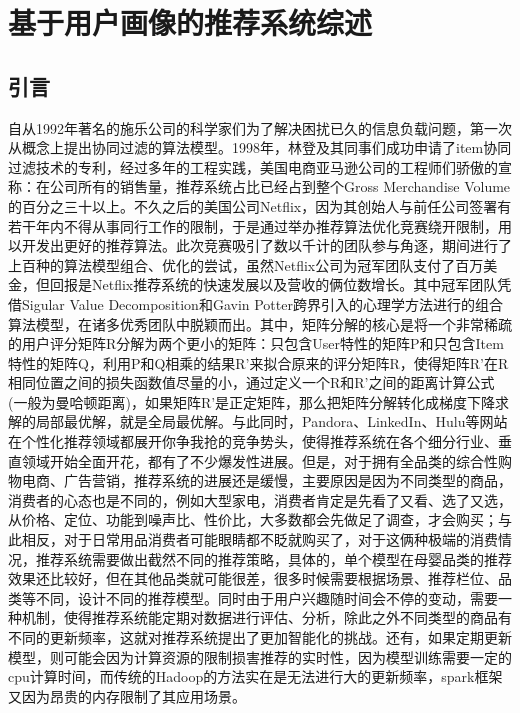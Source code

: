 \chapter{基于用户画像的推荐系统综述}
	\section{引言}
	自从1992年著名的施乐公司的科学家们为了解决困扰已久的信息负载问题，第一次从概念上提出协同过滤的算法模型。1998年，林登及其同事们成功申请了item协同过滤技术的专利，经过多年的工程实践，美国电商亚马逊公司的工程师们骄傲的宣称：在公司所有的销售量，推荐系统占比已经占到整个Gross Merchandise Volume的百分之三十以上。不久之后的美国公司Netflix，因为其创始人与前任公司签署有若干年内不得从事同行工作的限制，于是通过举办推荐算法优化竞赛绕开限制，用以开发出更好的推荐算法。此次竞赛吸引了数以千计的团队参与角逐，期间进行了上百种的算法模型组合、优化的尝试，虽然Netflix公司为冠军团队支付了百万美金，但回报是Netflix推荐系统的快速发展以及营收的俩位数增长。其中冠军团队凭借Sigular Value Decomposition和Gavin Potter跨界引入的心理学方法进行的组合算法模型，在诸多优秀团队中脱颖而出。其中，矩阵分解的核心是将一个非常稀疏的用户评分矩阵R分解为两个更小的矩阵：只包含User特性的矩阵P和只包含Item特性的矩阵Q，利用P和Q相乘的结果R'来拟合原来的评分矩阵R，使得矩阵R'在R相同位置之间的损失函数值尽量的小，通过定义一个R和R'之间的距离计算公式(一般为曼哈顿距离)，如果矩阵R'是正定矩阵，那么把矩阵分解转化成梯度下降求解的局部最优解，就是全局最优解。与此同时，Pandora、LinkedIn、Hulu等网站在个性化推荐领域都展开你争我抢的竞争势头，使得推荐系统在各个细分行业、垂直领域开始全面开花，都有了不少爆发性进展。但是，对于拥有全品类的综合性购物电商、广告营销，推荐系统的进展还是缓慢，主要原因是因为不同类型的商品，消费者的心态也是不同的，例如大型家电，消费者肯定是先看了又看、选了又选，从价格、定位、功能到噪声比、性价比，大多数都会先做足了调查，才会购买；与此相反，对于日常用品消费者可能眼睛都不眨就购买了，对于这俩种极端的消费情况，推荐系统需要做出截然不同的推荐策略，具体的，单个模型在母婴品类的推荐效果还比较好，但在其他品类就可能很差，很多时候需要根据场景、推荐栏位、品类等不同，设计不同的推荐模型。同时由于用户兴趣随时间会不停的变动\citep{user-interests-explore,user-interests-explore1,user-interests-explore3,user-interests-explore4}，需要一种机制，使得推荐系统能定期对数据进行评估、分析，除此之外不同类型的商品有不同的更新频率，这就对推荐系统提出了更加智能化的挑战。还有，如果定期更新模型，则可能会因为计算资源的限制损害推荐的实时性\citep{temporal-cf}，因为模型训练需要一定的cpu计算时间，而传统的Hadoop的方法实在是无法进行大的更新频率，spark框架又因为昂贵的内存限制了其应用场景。

